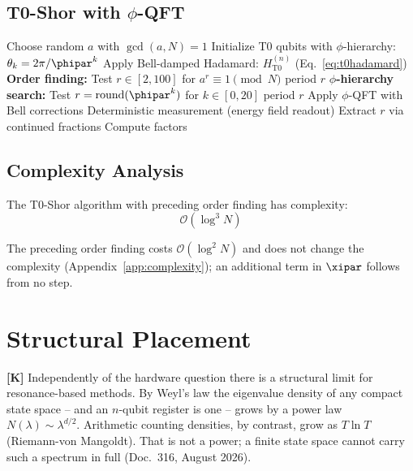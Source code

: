 \subsection{T0-Shor with $\phi$-QFT}

\begin{algorithm}[H]
	\caption{T0-Shor Algorithm}
	\begin{algorithmic}[1]
		\STATE Choose random $a$ with $\gcd(a, N) = 1$
		\STATE Initialize T0 qubits with $\phi$-hierarchy: $\theta_k = 2\pi/\phipar^k$
		\STATE Apply Bell-damped Hadamard: $H_{\text{T0}}^{(n)}$ (Eq.~\ref{eq:t0hadamard})
		\STATE \textbf{Order finding:} Test $r \in [2, 100]$ for $a^r \equiv 1 \pmod{N}$
		 \RETURN period $r$
		\ENDIF
		\STATE \textbf{$\phi$-hierarchy search:} Test $r = \text{round}(\phipar^k)$ for $k \in [0, 20]$
		 \RETURN period $r$
		\ENDIF
		\STATE Apply $\phi$-QFT with Bell corrections
		\STATE Deterministic measurement (energy field readout)
		\STATE Extract $r$ via continued fractions
		\STATE Compute factors
	\end{algorithmic}
\end{algorithm}

\subsection{Complexity Analysis}

\begin{proposition}
	The T0-Shor algorithm with preceding order finding has complexity:
	\begin{equation}
		\mathcal{O}\left(\log^3 N\right)
	\end{equation}
\end{proposition}

The preceding order finding costs $\mathcal{O}(\log^2 N)$ and does not change the complexity (Appendix~\ref{app:complexity}); an additional term in $\xipar$ follows from no step.

\section{Structural Placement}

\textbf{[K]} Independently of the hardware question there is a structural limit
for resonance-based methods. By Weyl's law the eigenvalue density of any compact
state space -- and an $n$-qubit register is one -- grows by a power law
$N(\lambda) \sim \lambda^{d/2}$. Arithmetic counting densities, by contrast,
grow as $T \ln T$ (Riemann-von Mangoldt). That is not a power; a finite state
space cannot carry such a spectrum in full (Doc.~316, August 2026).

